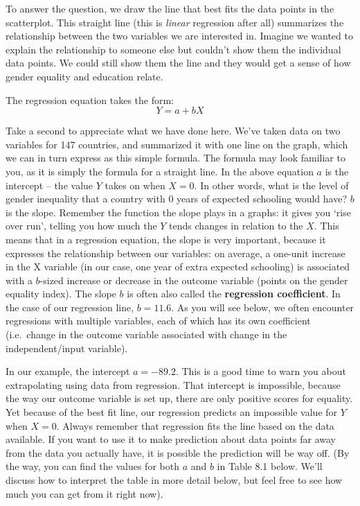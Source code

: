 \documentclass{book}
\begin{document}
To answer the question, we draw the line that best fits the data points in the
scatterplot. This straight line (this is \emph{linear} regression after all)
summarizes the relationship between the two variables we are interested in.
Imagine we wanted to explain the relationship to someone else but couldn't
show them the individual data points. We could still show them the line and
they would get a sense of how gender equality and education relate.

The regression equation takes the form: \[Y = a + bX\]

Take a second to appreciate what we have done here. We've taken data on two
variables for 147 countries, and summarized it with one line on the graph,
which we can in turn express as this simple formula. The formula may look
familiar to you, as it is simply the formula for a straight line. In the above
equation \(a\) is the intercept -- the value \(Y\) takes on when \(X=0\). In
other words, what is the level of gender inequality that a country with 0
years of expected schooling would have? \(b\) is the slope. Remember the
function the slope plays in a graphs: it gives you `rise over run', telling
you how much the \(Y\) tends changes in relation to the \(X\). This means that
in a regression equation, the slope is very important, because it expresses
the relationship between our variables: on average, a one-unit increase in the
X variable (in our case, one year of extra expected schooling) is associated
with a \(b\)-sized increase or decrease in the outcome variable (points on the
gender equality index). The slope \(b\) is often also called the
\textbf{regression coefficient}. In the case of our regression line,
\(b=11.6\). As you will see below, we often encounter regressions with
multiple variables, each of which has its own coefficient (i.e.~change in the
outcome variable associated with change in the independent/input variable).

In our example, the intercept \(a=-89.2\). This is a good time to warn you
about extrapolating using data from regression. That intercept is impossible,
because the way our outcome variable is set up, there are only positive scores
for equality. Yet because of the best fit line, our regression predicts an
impossible value for \(Y\) when \(X=0\). Always remember that regression fits
the line based on the data available. If you want to use it to make prediction
about data points far away from the data you actually have, it is possible the
prediction will be way off. (By the way, you can find the values for both
\(a\) and \(b\) in Table 8.1 below. We'll discuss how to interpret the table
in more detail below, but feel free to see how much you can get from it right
now).
\end{document}
